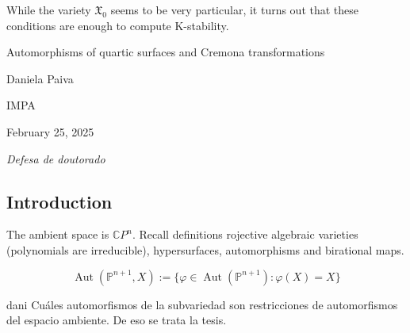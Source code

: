 \begin{remark}\leavevmode
While the variety \(\mathfrak{X}_0\) seems to be very particular, it turns out that these conditions are enough to compute K-stability.
\end{remark}
\iffalse
\subsubsection{Towards }

\begin{thing8}{Useful remark}[Fujita '16, BHJ'17 §4]\leavevmode
\[\begin{tikzcd}
&Y\arrow[dl,"f",swap]\arrow[dr,"g"]\\
\mathfrak{X}\arrow[rr,dashed]&&X \times \mathbb{A}^1
\end{tikzcd}\]
If \(\mathcal{L}=-K_{\mathfrak{X}/\mathbb{A}^1}\) and \(L=-K_X\) since \(K_{\mathbb{A}^1}=0\), we have
\begin{align*}
D&=
\end{align*}
\end{thing8}
\fi


\clearpage{}
{\Huge Automorphisms of quartic surfaces and Cremona transformations}

\hfill{\Large Daniela Paiva}

{\Large \hfill IMPA}

\hfill{\large February 25, 2025

\hfill \textit{Defesa de doutorado}}
\subsection{Introduction}

The ambient space is \(\mathbb{C}P^{n}\). Recall definitions rojective algebraic varieties (polynomials are irreducible), hypersurfaces, automorphisms and birational maps.

\[\operatorname{Aut}(\mathbb{P}^{n+1},X):=\{ \varphi\in \operatorname{Aut}(\mathbb{P}^{n+1}):\varphi(X)=X\}\]

\begin{thing7}{dani}\leavevmode
Cuáles automorfismos de la subvariedad son restricciones de automorfismos del espacio ambiente. De eso se trata la tesis.
\end{thing7}

